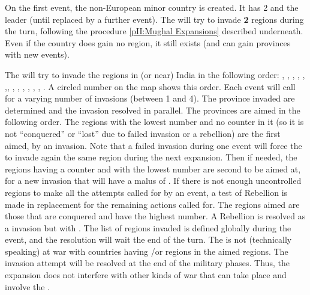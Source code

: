 

\phevnt
\aparag On the first event, the non-European minor country \paysMogol is
created. It has 2 \ARMY\faceplus and the leader  (until
replaced by a further event).
\aparag The \paysMogol will try to invade \textbf{2} regions during the turn,
following the procedure \ref{pII:Mughal Expansions} described underneath.
\aparag Even if the country does gain no region, it still exists (and can gain
provinces with new events).





\phevnt
\aparag The \paysMogol will try to invade the regions in (or near) India in
the following order: \granderegionDelhi, \granderegionAfghanistan,
\granderegionAoudh, \granderegionBengale, \granderegionGujarat,
\granderegionPendjab,\granderegionIndus, \granderegionBalouchistan,
\granderegionOrissa, \granderegionGondwana, \granderegionMumbai,
\granderegionHyderabad, \granderegionMalabar, \granderegionKarnatika. A
circled number on the map shows this order.
\aparag Each event will call for a varying number of invasions (between 1 and
4). The province invaded are determined and the invasion resolved in
parallel. The provinces are aimed in the following order.
\bparag The regions with the lowest number and no \paysMogol
{} counter in it (so it is not ``conquered'' or ``lost'' due
to failed invasion or a rebellion) are the first aimed, by an invasion. Note
that a failed invasion during one event will force the \paysMogol to invade
again the same region during the next expansion.
\bparag Then if needed, the regions having a \paysMogol {} counter and with the lowest number are second to be aimed at, for a
new invasion that will have a malus of .
\bparag If there is not enough uncontrolled regions to make all the attempts
called for by an event, a test of Rebellion is made in replacement for the
remaining actions called for. The regions aimed are those that are conquered
and have the highest number. A Rebellion is resolved as a invasion but with
.
\aparag The list of regions invaded is defined globally during the event, and
the resolution will wait the end of the turn. The \paysMogol is not
(technically speaking) at war with countries having \TP/\COL or regions in the
aimed regions. The invasion attempt will be resolved at the end of the
military phases. Thus, the expansion does not interfere with other kinds of
war that can take place and involve the \paysMogol.

